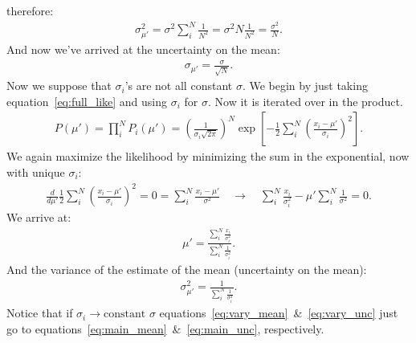 \documentclass{article}
\begin{document}
therefore:
\begin{align*}
  \sigma_{\mu'}^2 = \sigma^2\sum_i^N \frac{1}{N^2} = \sigma^2N\frac{1}{N^2} = \frac{\sigma^2}{N}.
\end{align*}
And now we've arrived at the uncertainty on the mean:
\begin{align}
  \sigma_{\mu'} = \frac{\sigma}{\sqrt{N}}.
  \label{eq:main_unc}
\end{align}
Now we suppose that $\sigma_i$'s are not all constant $\sigma$. We begin by just taking equation~\ref{eq:full_like} and using $\sigma_i$ for $\sigma$. Now it is iterated over in the product.
\begin{align}
  P(\mu') = \prod_i^NP_i(\mu') = \left(\frac{1}{\sigma_i\sqrt{2\pi}}\right)^N\exp\left[-\frac{1}{2}\sum_i^N\left(\frac{x_i-\mu'}{\sigma_i}\right)^2\right].
\end{align}
We again maximize the likelihood by minimizing the sum in the exponential, now with unique $\sigma_i$:
\begin{align*}
  \frac{d}{d\mu'}\frac{1}{2}\sum_i^N\left(\frac{x_i-\mu'}{\sigma_i}\right)^2 = 0 = \sum_i^N \frac{x_i-\mu'}{\sigma^2} \quad \rightarrow \quad \sum_i^N \frac{x_i}{\sigma_i^2} - \mu'\sum_i^N \frac{1}{\sigma^2} = 0.
\end{align*}
We arrive at:
\begin{align}
  \mu' = \frac{\sum_i^N\frac{x_i}{\sigma_i^2}}{\sum_i^N\frac{1}{\sigma_i^2}}.
  \label{eq:vary_mean}
\end{align}
And the variance of the estimate of the mean (uncertainty on the mean):
\begin{align}
  \sigma_{\mu'}^2 = \frac{1}{\sum_i^N\frac{1}{\sigma_i^2}}.
  \label{eq:vary_unc}
\end{align}
Notice that if $\sigma_i\rightarrow \text{constant } \sigma$ equations~\ref{eq:vary_mean}~\&~\ref{eq:vary_unc} just go to equations~\ref{eq:main_mean}~\&~\ref{eq:main_unc}, respectively.
\end{document}
